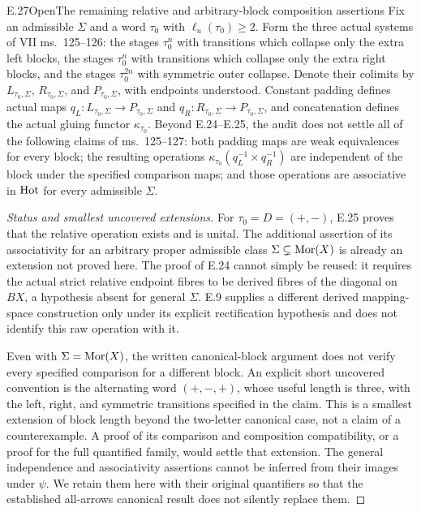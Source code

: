 \begin{claim}{E.27}{Open}{The remaining relative and arbitrary-block composition assertions}
Fix an admissible $\Sigma$ and a word $\tau_0$ with $\ell_u(\tau_0)\geq2$. Form the three actual systems of VII ms.~125--126: the stages $\tau_0^n$ with transitions which collapse only the extra left blocks, the stages $\tau_0^n$ with transitions which collapse only the extra right blocks, and the stages $\tau_0^{2n}$ with symmetric outer collapse. Denote their colimits by $L_{\tau_0,\Sigma}$, $R_{\tau_0,\Sigma}$, and $P_{\tau_0,\Sigma}$, with endpoints understood. Constant padding defines actual maps $q_L:L_{\tau_0,\Sigma}\to P_{\tau_0,\Sigma}$ and $q_R:R_{\tau_0,\Sigma}\to P_{\tau_0,\Sigma}$, and concatenation defines the actual gluing functor $\kappa_{\tau_0}$. Beyond E.24--E.25, the audit does not settle all of the following claims of ms.~125--127: both padding maps are weak equivalences for every block; the resulting operations $\kappa_{\tau_0}(q_L^{-1}\times q_R^{-1})$ are independent of the block under the specified comparison maps; and those operations are associative in $\mathrm{Hot}$ for every admissible $\Sigma$.
\end{claim}
\begin{proof}[Status and smallest uncovered extensions]
For $\tau_0=D=(+,-)$, E.25 proves that the relative operation exists and is unital. The additional assertion of its associativity for an arbitrary proper admissible class $\Sigma\subsetneq\operatorname{Mor}(X)$ is already an extension not proved here. The proof of E.24 cannot simply be reused: it requires the actual strict relative endpoint fibres to be derived fibres of the diagonal on $BX$, a hypothesis absent for general $\Sigma$. E.9 supplies a different derived mapping-space construction only under its explicit rectification hypothesis and does not identify this raw operation with it.

Even with $\Sigma=\operatorname{Mor}(X)$, the written canonical-block argument does not verify every specified comparison for a different block. An explicit short uncovered convention is the alternating word $(+,-,+)$, whose useful length is three, with the left, right, and symmetric transitions specified in the claim. This is a smallest extension of block length beyond the two-letter canonical case, not a claim of a counterexample. A proof of its comparison and composition compatibility, or a proof for the full quantified family, would settle that extension. The general independence and associativity assertions cannot be inferred from their images under $\psi$. We retain them here with their original quantifiers so that the established all-arrows canonical result does not silently replace them.
\end{proof}
